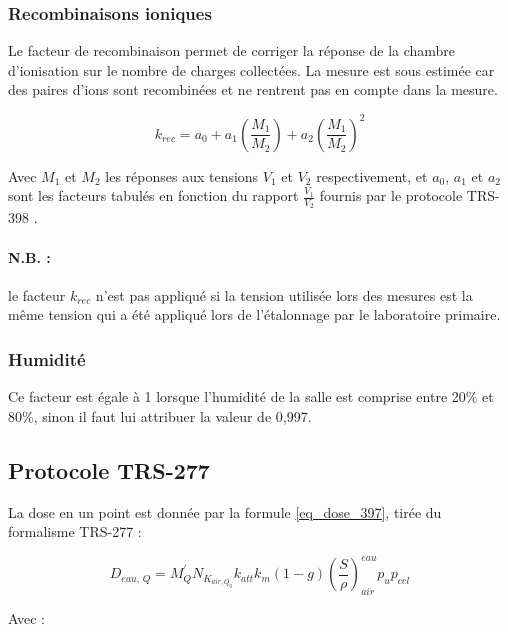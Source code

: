 \documentclass{article}
\begin{document}
\subsubsection{Recombinaisons ioniques}

Le facteur de recombinaison permet de corriger la réponse de la chambre d'ionisation sur le nombre de charges collectées. La mesure est sous estimée car des paires d'ions sont recombinées et ne rentrent pas en compte dans la mesure.

\begin{equation}
  k_{rec} = a_0 + a_1 \left(\dfrac{M_1}{M_2}\right) + a_2 \left(\dfrac{M_1}{M_2}\right) ^2
  \label{eq_rec}
\end{equation}

Avec $M_1$ et $M_2$ les réponses aux tensions $V_1$ et $V_2$ respectivement, et $a_0$, $a_1$ et $a_2$ sont les facteurs tabulés en fonction du rapport $\frac{V_1}{V_2}$ fournis par le protocole TRS-398 \cite{international2001iaea}.

\paragraph*{N.B. :} le facteur $k_{rec}$ n'est pas appliqué si la tension utilisée lors des mesures est la même tension qui a été appliqué lors de l'étalonnage par le laboratoire primaire.

\subsubsection{Humidité}

Ce facteur est égale à 1 lorsque l'humidité de la salle est comprise entre 20\% et 80\%, sinon il faut lui attribuer la valeur de 0,997.

\subsection{Protocole TRS-277}

La dose en un point est donnée par la formule \ref*{eq_dose_397}, tirée du formalisme TRS-277 :

\begin{equation}
  D_{eau,\, Q} = M_Q^{'} N_{K_{air, Q_0}} k_{att} k_m (1-g) \left( \dfrac{S}{\rho} \right)^{eau}_{air} p_u p_{cel}
  \label{eq_dose_397}
\end{equation}

Avec :
\end{document}
